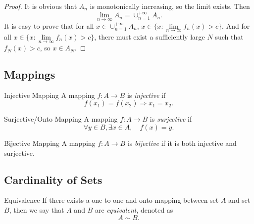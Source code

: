 \begin{proof}
  It is obvious that $A_n$ is monotonically increasing, so the limit exists.
  Then
  \begin{equation}
    \lim \limits _{n \rightarrow \infty} A_n = \cup _{n = 1}^{+\infty}A_n.
  \end{equation}
  It is easy to prove that for all $x \in \cup _{n = 1}^{+\infty}A_n$,
  $x \in \{x: \lim \limits _{n \rightarrow \infty} f_n(x) > c\}$.
  And for all $x \in \{x: \lim \limits _{n \rightarrow \infty} f_n(x) > c\}$,
  there must exist a sufficiently large $N$ such that $f_N(x) > c$,
  so $x \in A_N$.
\end{proof}

\subsection{Mappings}

\begin{definition}{Injective Mapping}{}
  A mapping $f:A \rightarrow B$ is \emph{injective} if
  \begin{equation}
    f(x_1) = f(x_2) \Rightarrow x_1 = x_2.
  \end{equation}
\end{definition}

\begin{definition}{Surjective/Onto Mapping}{}
  A mapping $f:A \rightarrow B$ is \emph{surjective} if
  \begin{equation}
    \forall y \in B, \exists x \in A, \quad f(x) = y.
  \end{equation}
\end{definition}

\begin{definition}{Bijective Mapping}{}
  A mapping $f:A \rightarrow B$ is \emph{bijective} if it is both injective and surjective.
\end{definition}

\subsection{Cardinality of Sets}

\begin{definition}{Equivalence}{}
  If there exists a one-to-one and onto mapping between set $A$ and set $B$,
  then we say that $A$ and $B$ are \emph{equivalent}, denoted as
  \begin{equation}
    A \sim B.
  \end{equation}
\end{definition}

